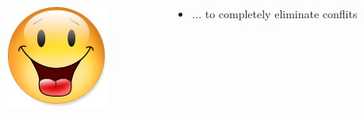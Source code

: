 \documentclass[xcolor={x11names,svgnames},x11names,svgnames]{beamer}
\begin{document}
\begin{frame}[label=idea1]
  \vspace{1cm}
  
  \begin{columns}[c]
    \begin{column}{.1\textwidth}
      \vspace{3mm}
      \includegraphics[width=\textwidth]{Content.png}
    \end{column}
    
    \begin{column}{.9\textwidth}
      \begin{itemize}
      \item ... to completely eliminate conflits
      \end{itemize}
    \end{column}
  \end{columns}  
\end{frame}



\end{document}
